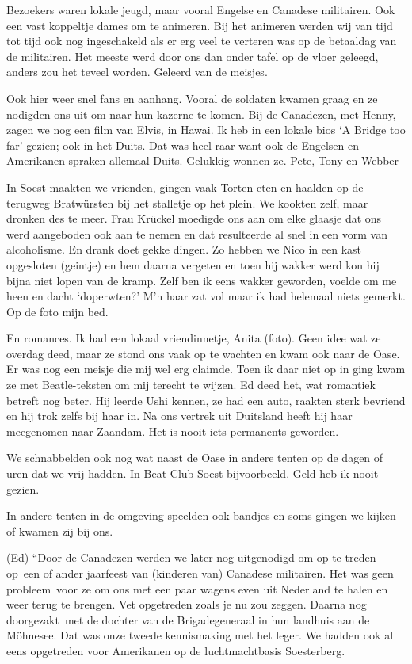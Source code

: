 \documentclass[10pt,twoside,openright]{memoir}
\begin{document}
Bezoekers waren lokale jeugd, maar vooral Engelse en Canadese militairen. Ook een vast koppeltje dames om te animeren. Bij het animeren werden wij van tijd tot tijd ook nog ingeschakeld als er erg veel te verteren was op de betaaldag van de militairen. Het meeste werd door ons dan onder tafel op de vloer geleegd, anders zou het teveel worden. Geleerd van de meisjes. 

Ook hier weer snel fans en aanhang. Vooral de soldaten kwamen graag en ze nodigden ons uit om naar hun kazerne te komen. Bij de Canadezen, met Henny, zagen we nog een film van Elvis, in Hawai. Ik heb in een lokale bios ‘A Bridge too far’ gezien; ook in het Duits. Dat was heel raar want ook de Engelsen en Amerikanen spraken allemaal Duits. Gelukkig wonnen ze. Pete, Tony en Webber

In Soest maakten we vrienden, gingen vaak Torten eten en haalden op de terugweg Bratwürsten bij het stalletje op het plein. We kookten zelf, maar dronken des te meer. Frau Krückel moedigde ons aan om elke glaasje dat ons werd aangeboden ook aan te nemen en dat resulteerde al snel in een vorm van alcoholisme. En drank doet gekke dingen. Zo hebben we Nico in een kast opgesloten (geintje) en hem daarna vergeten en toen hij wakker werd kon hij bijna niet lopen van de kramp. Zelf ben ik eens wakker geworden, voelde om me heen en dacht ‘doperwten?’ M’n haar zat vol maar ik had helemaal niets gemerkt. Op de foto mijn bed.

En romances. Ik had een lokaal vriendinnetje, Anita (foto). Geen idee wat ze overdag deed, maar ze stond ons vaak op te wachten en kwam ook naar de Oase. Er was nog een meisje die mij wel erg claimde. Toen ik daar niet op in ging kwam ze met Beatle-teksten om mij terecht te wijzen. Ed deed het, wat romantiek betreft nog beter. Hij leerde Ushi kennen, ze had een auto, raakten sterk bevriend en hij trok zelfs bij haar in. Na ons vertrek uit Duitsland heeft hij haar meegenomen naar Zaandam. Het is nooit iets permanents geworden.

We schnabbelden ook nog wat naast de Oase in andere tenten op de dagen of uren dat we vrij hadden. In Beat Club Soest bijvoorbeeld. Geld heb ik nooit gezien. 

In andere tenten in de omgeving speelden ook bandjes en soms gingen we kijken of kwamen zij bij ons. 	

(Ed) “Door de Canadezen werden we later nog uitgenodigd om op te treden op een of ander jaarfeest van (kinderen van) Canadese militairen. Het was geen probleem voor ze om ons met een paar wagens even uit Nederland te halen en weer terug te brengen. Vet opgetreden zoals je nu zou zeggen. Daarna nog doorgezakt met de dochter van de Brigadegeneraal in hun landhuis aan de Möhnesee. Dat was onze tweede kennismaking met het leger. We hadden ook al eens opgetreden voor Amerikanen op de luchtmachtbasis Soesterberg. 
\end{document}
